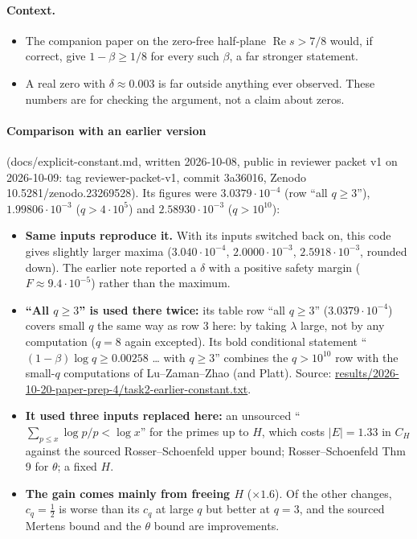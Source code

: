 \documentclass[11pt]{article}
\newcommand{\Rea}{\operatorname{Re}}
\begin{document}
\paragraph{Context.}
\begin{itemize}
\item The companion paper on the zero-free half-plane $\Rea s>7/8$ would, if correct, give $1-\beta\ge 1/8$ for every such $\beta$, a far stronger statement.
\item A real zero with $\delta\approx0.003$ is far outside anything ever observed. These numbers are for checking the argument, not a claim about zeros.
\end{itemize}

\paragraph{Comparison with an earlier version} (docs/explicit-constant.md, written 2026-10-08, public in reviewer packet v1 on 2026-10-09: tag reviewer-packet-v1, commit 3a36016, Zenodo 10.5281/zenodo.23269528). Its figures were $3.0379\cdot10^{-4}$ (row ``all $q\ge3$''), $1.99806\cdot10^{-3}$ ($q>4\cdot10^5$) and $2.58930\cdot10^{-3}$ ($q>10^{10}$):
\begin{itemize}
\item \textbf{Same inputs reproduce it.} With its inputs switched back on, this code gives slightly larger maxima ($3.040\cdot10^{-4}$, $2.0000\cdot10^{-3}$, $2.5918\cdot10^{-3}$, rounded down). The earlier note reported a $\delta$ with a positive safety margin ($F\approx9.4\cdot10^{-5}$) rather than the maximum.
\item \textbf{``All $q\ge3$'' is used there twice:} its table row ``all $q\ge3$'' ($3.0379\cdot10^{-4}$) covers small $q$ the same way as row 3 here: by taking $\lambda$ large, not by any computation ($q=8$ again excepted). Its bold conditional statement ``$(1-\beta)\log q\ge0.00258$ \dots{} with $q\ge3$'' combines the $q>10^{10}$ row with the small-$q$ computations of Lu--Zaman--Zhao (and Platt). Source: \url{results/2026-10-20-paper-prep-4/task2-earlier-constant.txt}.
\item \textbf{It used three inputs replaced here:} an unsourced ``$\sum_{p\le x}\log p/p<\log x$'' for the primes up to $H$, which costs $|E|=1.33$ in $C_H$ against the sourced Rosser--Schoenfeld upper bound; Rosser--Schoenfeld Thm 9 for $\theta$; a fixed $H$.
\item \textbf{The gain comes mainly from freeing $H$} ($\times1.6$). Of the other changes, $c_q=\frac12$ is worse than its $c_q$ at large $q$ but better at $q=3$, and the sourced Mertens bound and the $\theta$ bound are improvements.
\end{itemize}
\end{document}
